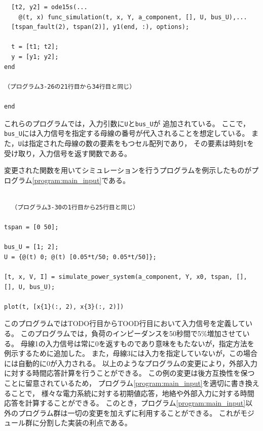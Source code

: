 \documentclass[tombow,dvipdfmx]{corona-a5-1.1}
\begin{document}
\begin{例}
\begin{PROGRAMA}[count,title={simulate\_power\_system.m}]
\begin{verbatim}
  [t2, y2] = ode15s(...
    @(t, x) func_simulation(t, x, Y, a_component, [], U, bus_U),...
  [tspan_fault(2), tspan(2)], y1(end, :), options);

  t = [t1; t2];
  y = [y1; y2];
end

（プログラム3-26の21行目から34行目と同じ）

end
\end{verbatim}
\end{PROGRAMA}

これらのプログラムでは，入力引数に\verb|U|と\verb|bus_U|が
追加されている。
ここで，\verb|bus_U|には入力信号を指定する母線の番号が代入されることを想定している。
また，\verb|U|は指定された母線の数の要素をもつセル配列であり，
その要素は時刻\verb|t|を受け取り，入力信号を返す関数である。

変更された関数を用いてシミュレーションを行うプログラムを例示したものがプログラム\nobreak\ref{program:main_input}である。

\begin{PROGRAMA}[count,title={main\_simulation\_3bus\_input.m}]\label{program:main_input}
\begin{verbatim}

  （プログラム3-30の1行目から25行目と同じ）

tspan = [0 50];

bus_U = [1; 2];
U = {@(t) 0; @(t) [0.05*t/50; 0.05*t/50]};

[t, x, V, I] = simulate_power_system(a_component, Y, x0, tspan, [], [], U, bus_U);

plot(t, [x{1}(:, 2), x{3}(:, 2)])
  \end{verbatim}
\end{PROGRAMA}

このプログラムではTODO行目からTOOD行目において入力信号を定義している。
このプログラムでは，負荷のインピーダンスを50秒間で5\%増加させている。
母線1の入力信号は常に0を返すものであり意味をもたないが，指定方法を例示するために追加した。
また，母線3には入力を指定していないが，この場合には自動的に0が入力される。
以上のようなプログラムの変更により，外部入力に対する時間応答計算を行うことができる。
この例の変更は後方互換性を保つことに留意されているため，
プログラム\nobreak\ref{program:main_input}を適切に書き換えることで，
様々な電力系統に対する初期値応答，地絡や外部入力に対する時間応答を計算することができる。
このとき，プログラム\nobreak\ref{program:main_input}以外のプログラム群は一切の変更を加えずに利用することができる。
これがモジュール群に分割した実装の利点である。
\end{例}
\newpage
\end{document}
